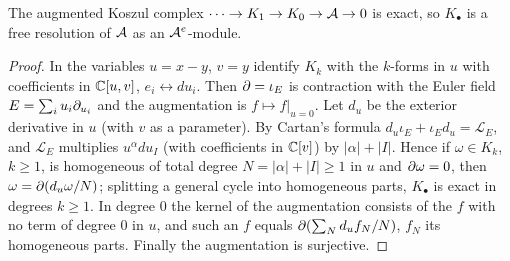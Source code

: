 \begin{lemma}\label{hochschild:lem:Koszul}
The augmented Koszul complex $\dots\to K_1\to K_0\to\mathcal{A}\to0$ is exact, so $K_\bullet$
is a free resolution of $\mathcal{A}$ as an $\mathcal{A}^e$-module.
\end{lemma}
\begin{proof}
In the variables $u=x-y$, $v=y$ identify $K_k$ with the $k$-forms in $u$ with
coefficients in $\mathbb{C}[u,v]$, $e_i\leftrightarrow du_i$. Then $\partial=\iota_E$ is
contraction with the Euler field $E=\sum_iu_i\partial_{u_i}$ and the augmentation
is $f\mapsto f|_{u=0}$. Let $d_u$ be the exterior derivative in $u$ (with $v$
as a parameter). By Cartan's formula $d_u\iota_E+\iota_Ed_u=\mathcal L_E$,
and $\mathcal L_E$ multiplies $u^\alpha du_I$ (with coefficients in $\mathbb{C}[v]$)
by $|\alpha|+|I|$. Hence if $\omega\in K_k$, $k\ge1$, is homogeneous of total
degree $N=|\alpha|+|I|\ge1$ in $u$ and $\partial\omega=0$, then
$\omega=\partial(d_u\omega/N)$; splitting a general cycle into homogeneous parts,
$K_\bullet$ is exact in degrees $k\ge1$. In degree $0$ the kernel of the
augmentation consists of the $f$ with no term of degree $0$ in $u$, and such
an $f$ equals $\partial(\sum_N d_uf_N/N)$, $f_N$ its homogeneous parts. Finally the
augmentation is surjective.
\end{proof}

